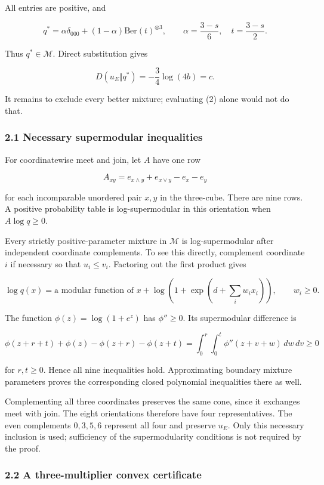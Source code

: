 All entries are positive, and

\[
q^*=\alpha\delta_{000}+(1-\alpha)\mathrm{Ber}(t)^{\otimes3},
\qquad \alpha=\frac{3-s}{6},\quad t=\frac{3-s}{2}.
\tag{1}
\]

Thus \(q^*\in\mathcal M\). Direct substitution gives

\[
D(u_E\Vert q^*)=-\frac34\log(4b)=c.
\tag{2}
\]

It remains to exclude every better mixture; evaluating (2) alone would
not do that.

\subsubsection{2.1 Necessary supermodular
inequalities}\label{necessary-supermodular-inequalities}

For coordinatewise meet and join, let \(A\) have one row

\[
A_{xy}=e_{x\wedge y}+e_{x\vee y}-e_x-e_y
\]

for each incomparable unordered pair \(x,y\) in the three-cube. There
are nine rows. A positive probability table is log-supermodular in this
orientation when \(A\log q\ge0\).

Every strictly positive-parameter mixture in \(\mathcal M\) is
log-supermodular after independent coordinate complements. To see this
directly, complement coordinate \(i\) if necessary so that
\(u_i\le v_i\). Factoring out the first product gives

\[
\log q(x)=\text{a modular function of }x
 +\log(1+\exp(d+\sum_i w_i x_i)),\qquad w_i\ge0.
\]

The function \(\phi(z)=\log(1+e^z)\) has \(\phi''\ge0\). Its
supermodular difference is

\[
\phi(z+r+t)+\phi(z)-\phi(z+r)-\phi(z+t)
=\int_0^r\int_0^t\phi''(z+v+w)\,dw\,dv\ge0
\]

for \(r,t\ge0\). Hence all nine inequalities hold. Approximating
boundary mixture parameters proves the corresponding closed polynomial
inequalities there as well.

Complementing all three coordinates preserves the same cone, since it
exchanges meet with join. The eight orientations therefore have four
representatives. The even complements \(0,3,5,6\) represent all four and
preserve \(u_E\). Only this necessary inclusion is used; sufficiency of
the supermodularity conditions is not required by the proof.

\subsubsection{2.2 A three-multiplier convex
certificate}\label{a-three-multiplier-convex-certificate}

